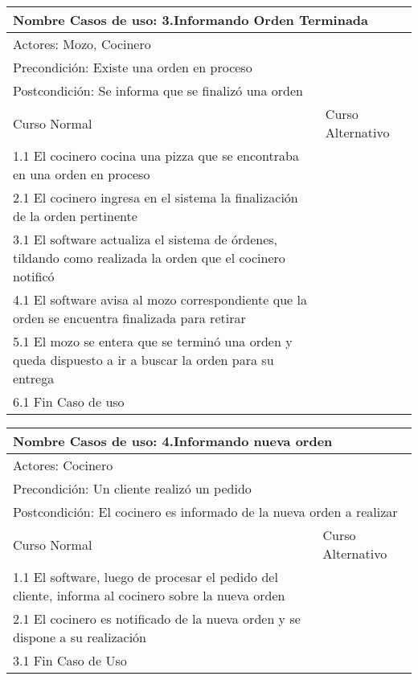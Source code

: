 \documentclass[a4paper,10pt]{article}
\begin{document}
\begin{center}
\begin{tabularx}{14cm}{|X|X|}
\hline
\multicolumn{2}{|l|}{Nombre Casos de uso: 3.Informando Orden Terminada}\\
\hline
\multicolumn{2}{|l|}{Actores: Mozo, Cocinero}\\
\hline
\multicolumn{2}{|l|}{Precondici\'on: Existe una orden en proceso}\\
\hline
\multicolumn{2}{|l|}{Postcondici\'on: Se informa que se finaliz\'o una orden}\\
\hline
Curso Normal & Curso Alternativo\\
\hline
1.1 El cocinero cocina una pizza que se encontraba en una orden en proceso & 
\\
\hline
2.1 El cocinero ingresa en el sistema la finalizaci\'on de la orden pertinente & 
\\
\hline
3.1 El software actualiza el sistema de órdenes, tildando como realizada la orden que el cocinero notific\'o &
\\
\hline
4.1 El software avisa al mozo correspondiente que la orden se encuentra finalizada para retirar &
\\
\hline
5.1 El mozo se entera que se termin\'o una orden y queda dispuesto a ir a buscar la orden para su entrega &
\\
\hline
6.1 Fin Caso de uso &
\\
\hline
\end{tabularx}
\end{center}

\bigskip

\begin{center}
\begin{tabularx}{14cm}{|X|X|}
\hline
\multicolumn{2}{|l|}{Nombre Casos de uso: 4.Informando nueva orden}\\
\hline
\multicolumn{2}{|l|}{Actores: Cocinero}\\
\hline
\multicolumn{2}{|l|}{Precondici\'on: Un cliente realiz\'o un pedido}\\
\hline
\multicolumn{2}{|l|}{Postcondici\'on: El cocinero es informado de la nueva orden a realizar}\\
\hline
Curso Normal & Curso Alternativo\\
\hline
1.1 El software, luego de procesar el pedido del cliente, informa al cocinero sobre la nueva orden & 
\\
\hline
2.1 El cocinero es notificado de la nueva orden y se dispone a su realizaci\'on & 
\\
\hline
3.1 Fin Caso de Uso
\\
\hline
\end{tabularx}
\end{center}
\end{document}
